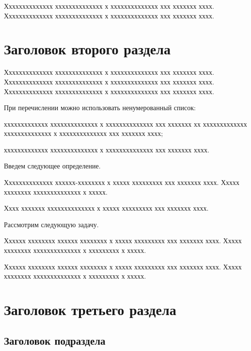 \documentclass[12pt]{a&t}
\begin{document}
Хххххххххххххх хххххххххххххх х хххххххххххххх ххх ххххххх хххх.
Хххххххххххххх хххххххххххххх х хххххххххххххх ххх ххххххх хххх.


\section{Заголовок второго раздела}

Хххххххххххххх хххххххххххххх х хххххххххххххх ххх ххххххх хххх.
Хххххххххххххх хххххххххххххх х хххххххххххххх ххх ххххххх хххх.
Хххххххххххххх хххххххххххххх х хххххххххххххх ххх ххххххх хххх.

При перечислении можно использовать ненумерованный список:
\begin{itemlist}
\item
ххххххххххххх хххххххххххххх х хххххххххххххх ххх ххххххх хх
ххххххххххххх хххххххххххххх х хххххххххххххх ххх ххххххх хххх;

\item
ххххххххххххх хххххххххххххх х хххххххххххххх ххх ххххххх хххх.
\end{itemlist}

Введем следующее определение.

\begin{definition}
Хххххххххххххх хххххх-хххххххх х ххххх ххххххххх ххх ххххххх хххх.
Ххххх хххххххх хххххххххххххх х ххххх.
\end{definition}

Хххх ххххххх хххххххххххххх х ххххх ххххххххх ххх ххххххх хххх.

Рассмотрим следующую задачу.

\begin{problem} \label{prob:1}
Хххххх хххххххх хххххх хххххххх х ххххх ххххххххх ххх ххххххх хххх.
Ххххх хххххххх хххххххххххххх х ххххххххх х ххххх.
\end{problem}

Хххххх хххххххх хххххх хххххххх х ххххх ххххххххх ххх ххххххх хххх.
Ххххх хххххххх хххххххххххххх х ххххххххх х ххххх.


\section{Заголовок третьего раздела}

\subsection{Заголовок подраздела}
\end{document}

